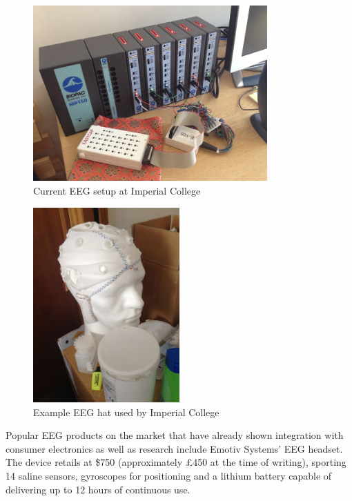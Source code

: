\documentclass[]{article}
\begin{document}
\begin{figure}[H]
	\begin{center}
		\includegraphics[width = 0.8\textwidth]{imperialcurrent}
	\end{center}
	\caption{Current \ac{EEG} setup at Imperial College}
	\label{fig:imperialcurrent}
\end{figure}

\begin{figure}[H]
	\begin{center}
		\includegraphics[width = 0.5\textwidth]{eeghat}
	\end{center}
	\caption{Example \ac{EEG} hat used by Imperial College}
	\label{fig:eeghat}
\end{figure}

Popular \ac{EEG} products on the market that have already shown integration with consumer electronics as well as research include Emotiv Systems' \ac{EEG} headset. The device retails at \$750 (approximately £450 at the time of writing), sporting 14 saline sensors, gyroscopes for positioning and a lithium battery capable of delivering up to 12 hours of continuous use.
\end{document}

